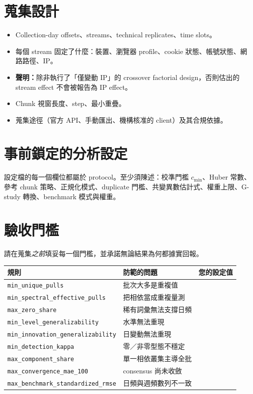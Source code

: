 \documentclass[12pt,a4paper,oneside]{article}
\begin{document}
\section{蒐集設計}

\begin{itemize}
\item Collection-day offsets、streams、technical replicates、time slots。
\item 每個 stream 固定了什麼：裝置、瀏覽器 profile、cookie 狀態、帳號狀態、網路路徑、IP。
\item \textbf{聲明：}除非執行了「僅變動 IP」的 crossover factorial design，否則估出的 stream effect 不會被報告為 IP effect。
\item Chunk 視窗長度、step、最小重疊。
\item 蒐集途徑（官方 API、手動匯出、機構核准的 client）及其合規依據。
\end{itemize}

\section{事前鎖定的分析設定}

設定檔的每一個欄位都屬於 protocol。至少須陳述：校準門檻 $c_{\min}$、Huber 常數、參考 chunk 策略、正規化模式、duplicate 門檻、共變異數估計式、權重上限、G-study 轉換、benchmark 模式與權重。

\section{驗收門檻}

請在蒐集\emph{之前}填妥每一個門檻，並承諾無論結果為何都據實回報。

\begin{table}[H]
\centering\small
\begin{tabularx}{\textwidth}{lXr}
\toprule
規則 & 防範的問題 & 您的設定值\\
\midrule
\texttt{min\_unique\_pulls} & 批次大多是重複值 & \\
\texttt{min\_spectral\_effective\_pulls} & 把相依當成重複量測 & \\
\texttt{max\_zero\_share} & 稀有詞彙無法支撐日頻 & \\
\texttt{min\_level\_generalizability} & 水準無法重現 & \\
\texttt{min\_innovation\_generalizability} & 日變動無法重現 & \\
\texttt{min\_detection\_kappa} & 零／非零型態不穩定 & \\
\texttt{max\_component\_share} & 單一相依叢集主導全批 & \\
\texttt{max\_convergence\_mae\_100} & consensus 尚未收斂 & \\
\texttt{max\_benchmark\_standardized\_rmse} & 日頻與週頻數列不一致 & \\
\bottomrule
\end{tabularx}
\end{table}
\end{document}
